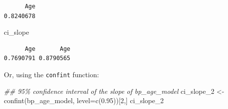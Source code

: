 \documentclass[
  letterpaper,
  8pt,
  a4paper]{book}
\newenvironment{Shaded}{\begin{snugshade}}{\end{snugshade}}
\newcommand{\AttributeTok}[1]{\textcolor[rgb]{0.40,0.45,0.13}{#1}}
\newcommand{\DecValTok}[1]{\textcolor[rgb]{0.68,0.00,0.00}{#1}}
\newcommand{\DocumentationTok}[1]{\textcolor[rgb]{0.37,0.37,0.37}{\textit{#1}}}
\newcommand{\FloatTok}[1]{\textcolor[rgb]{0.68,0.00,0.00}{#1}}
\newcommand{\FunctionTok}[1]{\textcolor[rgb]{0.28,0.35,0.67}{#1}}
\newcommand{\NormalTok}[1]{\textcolor[rgb]{0.00,0.23,0.31}{#1}}
\newcommand{\OtherTok}[1]{\textcolor[rgb]{0.00,0.23,0.31}{#1}}
\newcommand{\SpecialCharTok}[1]{\textcolor[rgb]{0.37,0.37,0.37}{#1}}
\begin{document}
\begin{Shaded}
\end{Shaded}

\begin{verbatim}
      Age 
0.8240678 
\end{verbatim}

\begin{Shaded}
\begin{Highlighting}[]
\NormalTok{ci\_slope}
\end{Highlighting}
\end{Shaded}

\begin{verbatim}
      Age       Age 
0.7690791 0.8790565 
\end{verbatim}

Or, using the \texttt{confint} function:

\begin{Shaded}
\begin{Highlighting}[]
\DocumentationTok{\#\# 95\% confidence interval of the slope of bp\_age\_model}
\NormalTok{ci\_slope\_2 }\OtherTok{\textless{}{-}} \FunctionTok{confint}\NormalTok{(bp\_age\_model, }\AttributeTok{level=}\FunctionTok{c}\NormalTok{(}\FloatTok{0.95}\NormalTok{))[}\DecValTok{2}\NormalTok{,]}
\NormalTok{ci\_slope\_2}
\end{Highlighting}
\end{Shaded}
\end{document}
